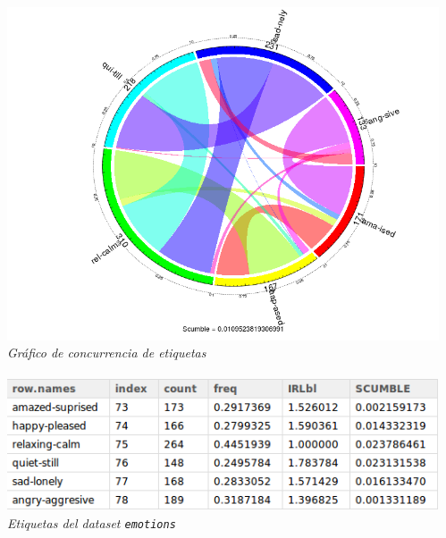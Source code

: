 \documentclass[8pt]{beamer}
\begin{document}
\begin{frame}
\begin{columns}[c]
\begin{column}{.5\textwidth}
		\end{column}
		\begin{column}{.5\textwidth}
			\begin{center}
				\includegraphics[width=.9\textwidth]{imgs/emotions-concurrence}
				\\ \centering \textit{Gráfico de concurrencia de etiquetas}
				\\~\\
				\includegraphics[width=.9\textwidth]{imgs/emotions-dataset}
				\\ \centering \textit{Etiquetas del dataset \texttt{emotions}}
			\end{center}
		\end{column}
	\end{columns}
  \end{frame}


\end{document}
